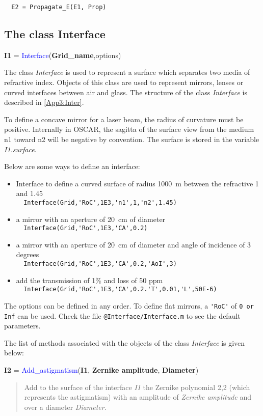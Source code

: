 \verb?  E2 = Propagate_E(E1, Prop) ?

\subsection{The class Interface}
\textbf{I1} = \textcolor{blue}{Interface}(\textbf{Grid\_name},options)

The class \textsl{Interface} is used to represent a surface which separates two media of refractive index. Objects of this class are used to represent mirrors, lenses or curved interfaces between air and glass. The structure of the class \textsl{Interface} is described in \ref{App3:Inter}.

To define a concave mirror for a laser beam, the radius of curvature must be positive. Internally in OSCAR, the sagitta of the surface view from the medium n1 toward n2 will be negative by convention. The surface is stored in the variable \textsl{I1.surface}.

Below are some ways to define an interface:
\begin{itemize}
  \item Interface to define a curved surface of radius 1000~m between the refractive 1 and 1.45 \\
        \verb?  Interface(Grid,'RoC',1E3,'n1',1,'n2',1.45) ?
  \item a mirror with an aperture of 20~cm of diameter \\
      \verb?  Interface(Grid,'RoC',1E3,'CA',0.2) ?
   \item a mirror with an aperture of 20~cm of diameter and angle of incidence of 3 degrees \\
      \verb?  Interface(Grid,'RoC',1E3,'CA',0.2,'AoI',3) ?
  \item add the transmission of 1\% and loss of 50 ppm\\
        \verb?  Interface(Grid,'RoC',1E3,'CA',0.2.'T',0.01,'L',50E-6) ?
\end{itemize}
The options can be defined in any order. To define flat mirrors, a \verb?'RoC'? of \verb?0 or Inf? can be used. Check the file \verb?@Interface/Interface.m? to see the default parameters.

The list of methods associated with the objects of the class \textsl{Interface} is given below:

\noindent \textbf{I2} = \textcolor{blue}{Add\_astigmatism}(\textbf{I1}, \textbf{Zernike amplitude}, \textbf{Diameter})
\vspace*{-0.2cm}
\begin{quote}
Add to the surface of the interface \textsl{I1} the Zernike polynomial 2,2 (which represents the astigmatism) with an amplitude of \textsl{Zernike amplitude} and over a diameter \textsl{Diameter}.
\end{quote}



